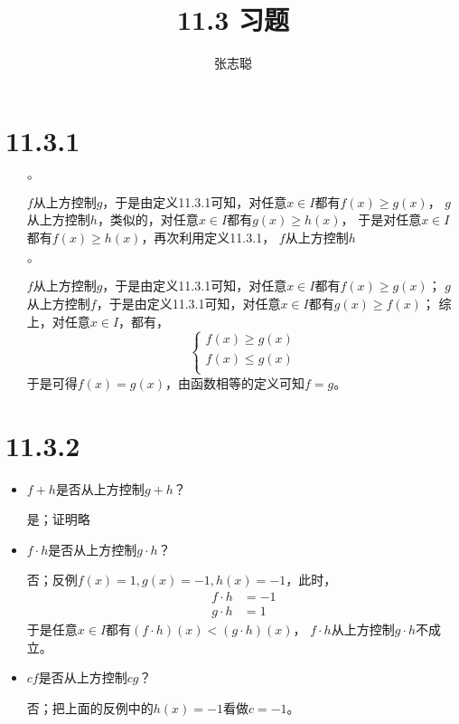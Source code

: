 \documentclass{article}
\begin{document}
\title{11.3 习题}
\author{张志聪}
\maketitle

\section*{11.3.1}

\begin{itemize}
  \item[$\circ$]

        $f$从上方控制$g$，于是由定义11.3.1可知，对任意$x \in I$都有$f(x) \geq g(x)$，
        $g$从上方控制$h$，类似的，对任意$x \in I$都有$g(x) \geq h(x)$，
        于是对任意$x \in I$都有$f(x) \geq h(x)$，再次利用定义11.3.1，
        $f$从上方控制$h$

  \item[$\circ$]

        $f$从上方控制$g$，于是由定义11.3.1可知，对任意$x \in I$都有$f(x) \geq g(x)$；
        $g$从上方控制$f$，于是由定义11.3.1可知，对任意$x \in I$都有$g(x) \geq f(x)$；
        综上，对任意$x \in I$，都有，
        \begin{equation*}
          \begin{cases*}
            f(x) \geq g(x) \\
            f(x) \leq g(x) \\
          \end{cases*}
        \end{equation*}
        于是可得$f(x) = g(x)$，由函数相等的定义可知$f=g$。

\end{itemize}

\section*{11.3.2}

\begin{itemize}
  \item $f + h$是否从上方控制$g + h$？

        是；证明略

  \item $f \cdot h$是否从上方控制$g \cdot h$？

        否；反例$f(x) = 1, g(x) = -1, h(x) = -1$，此时，
        \begin{align*}
          f \cdot h & = -1 \\
          g \cdot h & = 1
        \end{align*}
        于是任意$x \in I$都有$(f \cdot h)(x) < (g \cdot h)(x)$，
        $f \cdot h$从上方控制$g \cdot h$不成立。

  \item $cf$是否从上方控制$cg$？

        否；把上面的反例中的$h(x)=-1$看做$c=-1$。

\end{itemize}
\end{document}
